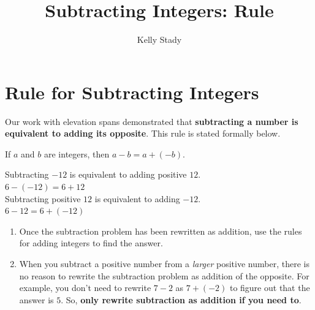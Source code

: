 \documentclass{ximera}[font=12pt]
\title{Subtracting Integers: Rule}   %
\author{Kelly Stady}
\begin{document}
\begin{abstract}

\end{abstract}

\maketitle
\label{xim:SubtractIntIntroActivity}

\section*{Rule for Subtracting Integers}

Our work with elevation spans demonstrated that \textbf{subtracting a number is equivalent to adding its opposite}. This rule is stated formally below.

\begin{procedure}


If $a$ and $b$ are integers, then $a-b = a + (-b).$  \\

\begin{example}

Subtracting $-12$ is equivalent to adding positive $12.$ \\
$6 - (-12) = 6 + 12$ \\

Subtracting positive $12$ is equivalent to adding $-12.$  \\
$6 - 12 = 6 + (-12)$

\end{example}
\end{procedure}

\begin{remark}

\begin{enumerate}

\item Once the subtraction problem has been rewritten as addition, use the rules for adding integers to find the answer.

\item When you subtract a positive number from a \emph{larger} positive number, there is no reason to rewrite the subtraction problem as
addition of the opposite.  For example, you don't need to rewrite $7-2$ as $7 + (-2)$ to figure out that the answer is $5.$  
So, \textbf{only rewrite subtraction as addition if you need to}.
\end{enumerate}

\end{remark}
\end{document}
